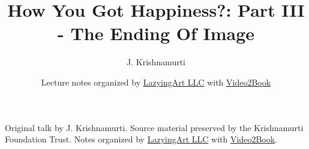 \documentclass[11pt,oneside]{book}
\begin{document}
\frontmatter
\title{How You Got Happiness?: Part III - The Ending Of Image}
\author{J. Krishnamurti}
\date{Lecture notes organized by \href{https://lazying.art}{LazyingArt LLC} with \href{https://github.com/lachlanchen/Video2Book}{Video2Book}}
\maketitle
\begin{center}
\small Original talk by J. Krishnamurti. Source material preserved by the Krishnamurti Foundation Trust. Notes organized by \href{https://lazying.art}{LazyingArt LLC} with \href{https://github.com/lachlanchen/Video2Book}{Video2Book}.
\end{center}
\clearpage
\mainmatter

\end{document}
